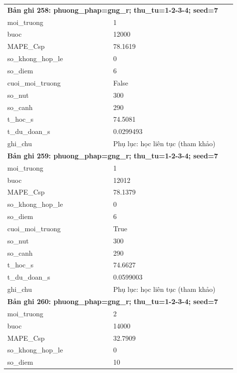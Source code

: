 \begin{longtable}{p{0.43\linewidth}p{0.50\linewidth}}
\midrule
\multicolumn{2}{p{0.95\linewidth}}{\textbf{Bản ghi 258: phuong\_phap=gng\_r; thu\_tu=1-2-3-4; seed=7}} \\
moi\_\allowbreak truong & 1 \\
buoc & 12000 \\
MAPE\_\allowbreak Csp & 78.1619 \\
so\_\allowbreak khong\_\allowbreak hop\_\allowbreak le & 0 \\
so\_\allowbreak diem & 6 \\
cuoi\_\allowbreak moi\_\allowbreak truong & False \\
so\_\allowbreak nut & 300 \\
so\_\allowbreak canh & 290 \\
t\_\allowbreak hoc\_\allowbreak s & 74.5081 \\
t\_\allowbreak du\_\allowbreak doan\_\allowbreak s & 0.0299493 \\
ghi\_\allowbreak chu & Phụ lục: học liên tục (tham khảo) \\
\midrule
\multicolumn{2}{p{0.95\linewidth}}{\textbf{Bản ghi 259: phuong\_phap=gng\_r; thu\_tu=1-2-3-4; seed=7}} \\
moi\_\allowbreak truong & 1 \\
buoc & 12012 \\
MAPE\_\allowbreak Csp & 78.1379 \\
so\_\allowbreak khong\_\allowbreak hop\_\allowbreak le & 0 \\
so\_\allowbreak diem & 6 \\
cuoi\_\allowbreak moi\_\allowbreak truong & True \\
so\_\allowbreak nut & 300 \\
so\_\allowbreak canh & 290 \\
t\_\allowbreak hoc\_\allowbreak s & 74.6627 \\
t\_\allowbreak du\_\allowbreak doan\_\allowbreak s & 0.0599003 \\
ghi\_\allowbreak chu & Phụ lục: học liên tục (tham khảo) \\
\midrule
\multicolumn{2}{p{0.95\linewidth}}{\textbf{Bản ghi 260: phuong\_phap=gng\_r; thu\_tu=1-2-3-4; seed=7}} \\
moi\_\allowbreak truong & 2 \\
buoc & 14000 \\
MAPE\_\allowbreak Csp & 32.7909 \\
so\_\allowbreak khong\_\allowbreak hop\_\allowbreak le & 0 \\
so\_\allowbreak diem & 10 \\

\end{longtable}
